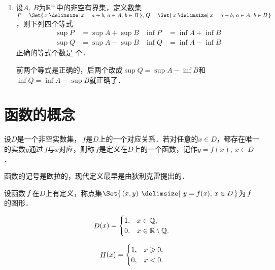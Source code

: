 \begin{enumerate}
\item 设\(A,\ B\)为\(\mathbb{R}^+\)中的非空有界集，定义数集\(P = \Set{\,x \mid x = a + b,\, a \in A,\, b \in B\,},\, Q = \Set{\,x \mid x = a - b,\, a \in A,\, b \in B\,}\)，则下列四个等式
  \begin{align*}
    \sup P &= \sup A + \sup B & \inf P &= \inf A + \inf B \\
    \sup Q &= \sup A - \sup B & \inf Q &= \inf A - \inf B
  \end{align*}
  正确的等式个数是
  \ifshowsol
    \uline{}%
  \else
    \uline{\makebox[4em]{}}%
  \fi
  个．

  \ifshowsol
    前两个等式是正确的，后两个改成\(\sup Q = \sup A - \inf B\)和\(\inf Q = \inf A - \sup B\)就正确了．
  \fi
\end{enumerate}
\fi

\section{函数的概念}

\begin{definition*}
  设\(D\)是一个非空实数集，\(\,f\)是\(D\)上的一个对应关系．若对任意的\(x \in D\)，都存在唯一的实数\(y\)通过\(\,f\)与\(x\)对应，则称\(\,f\)是定义在\(D\)上的一个函数，记作\(y = f(x),\ x \in D\)．
\end{definition*}

函数的记号是欧拉的，现代定义最早是由狄利克雷提出的．

\begin{definition*}
  设函数\(\,f\mkern2mu\)在\(D\)上有定义，称点集\(\Set{\,(x,y) \,\mid\, y = f(x),\, x \in D\,}\)为\(\,f\mkern2mu\)的图形．
\end{definition*}

\begin{definition}[狄利克雷函数]
  \label{defn:dirichlet}
  \[
    \mathop{\relax D}\nolimits(x) =
    \begin{cases}
      1, & x \in \mathbb{Q}, \\
      0, & x \in \mathbb{R} \setminus \mathbb{Q}.
    \end{cases}
  \]
\end{definition}

\begin{definition}[单位阶跃函数]
  \label{defn:heaviside}
  \[
    \Fn H(x) =
    \begin{cases}
      1, & x \ge 0, \\
      0, & x < 0.
    \end{cases}
  \]
\end{definition}

